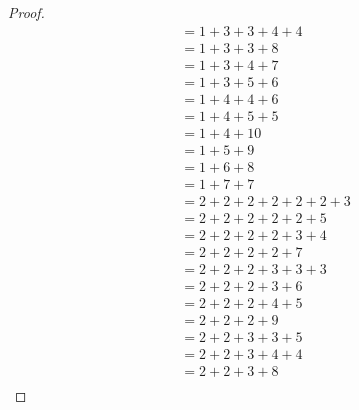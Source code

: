 \begin{proof}
\begin{align*}
           & = 1 + 3 + 3 + 4 + 4                                                   \\
           & = 1 + 3 + 3 + 8                                                       \\
           & = 1 + 3 + 4 + 7                                                       \\
           & = 1 + 3 + 5 + 6                                                       \\
           & = 1 + 4 + 4 + 6                                                       \\
           & = 1 + 4 + 5 + 5                                                       \\
           & = 1 + 4 + 10                                                          \\
           & = 1 + 5 + 9                                                           \\
           & = 1 + 6 + 8                                                           \\
           & = 1 + 7 + 7                                                           \\
           & = 2 + 2 + 2 + 2 + 2 + 2 + 3                                           \\
           & = 2 + 2 + 2 + 2 + 2 + 5                                               \\
           & = 2 + 2 + 2 + 2 + 3 + 4                                               \\
           & = 2 + 2 + 2 + 2 + 7                                                   \\
           & = 2 + 2 + 2 + 3 + 3 + 3                                               \\
           & = 2 + 2 + 2 + 3 + 6                                                   \\
           & = 2 + 2 + 2 + 4 + 5                                                   \\
           & = 2 + 2 + 2 + 9                                                       \\
           & = 2 + 2 + 3 + 3 + 5                                                   \\
           & = 2 + 2 + 3 + 4 + 4                                                   \\
           & = 2 + 2 + 3 + 8                                                       \\

\end{align*}
\end{proof}
